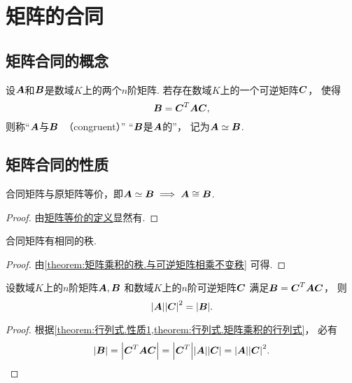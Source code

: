\section{矩阵的合同}
\subsection{矩阵合同的概念}
\begin{definition}
设\(\boldsymbol{A}\)和\(\boldsymbol{B}\)是数域\(K\)上的两个\(n\)阶矩阵.
若存在数域\(K\)上的一个可逆矩阵\(\boldsymbol{C}\)，
使得\[
	\boldsymbol{B}=\boldsymbol{C}^T\boldsymbol{A}\boldsymbol{C},
\]
则称“\(\boldsymbol{A}\)与\(\boldsymbol{B}\)~（congruent）”
“\(\boldsymbol{B}\)是\(\boldsymbol{A}\)的”，
记为\(\boldsymbol{A}\simeq\boldsymbol{B}\).
\end{definition}

\subsection{矩阵合同的性质}
\begin{property}
合同矩阵与原矩阵等价，即\(\boldsymbol{A}\simeq\boldsymbol{B} \implies \boldsymbol{A}\cong\boldsymbol{B}\).
\begin{proof}
由\hyperref[definition:逆矩阵.矩阵等价]{矩阵等价的定义}显然有.
\end{proof}
\end{property}

\begin{property}
合同矩阵有相同的秩.
\begin{proof}
由\cref{theorem:矩阵乘积的秩.与可逆矩阵相乘不变秩} 可得.
\end{proof}
\end{property}

\begin{proposition}\label{theorem:矩阵合同.合同矩阵的行列式的关系}
设数域\(K\)上的\(n\)阶矩阵\(\boldsymbol{A},\boldsymbol{B}\)
和数域\(K\)上的\(n\)阶可逆矩阵\(\boldsymbol{C}\)
满足\(\boldsymbol{B} = \boldsymbol{C}^T \boldsymbol{A} \boldsymbol{C}\)，
则\[
	\abs{\boldsymbol{A}} \abs{\boldsymbol{C}}^2
	= \abs{\boldsymbol{B}}.
\]
\begin{proof}
根据\cref{theorem:行列式.性质1,theorem:行列式.矩阵乘积的行列式}，
必有\[
	\abs{\boldsymbol{B}}
	= \abs{\boldsymbol{C}^T \boldsymbol{A} \boldsymbol{C}}
	= \abs{\boldsymbol{C}^T} \abs{\boldsymbol{A}} \abs{\boldsymbol{C}}
	= \abs{\boldsymbol{A}} \abs{\boldsymbol{C}}^2.
	\qedhere
\]
\end{proof}
\end{proposition}


